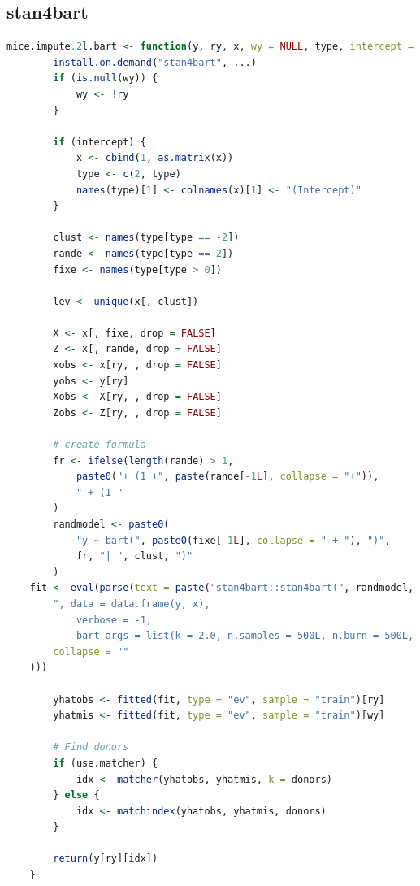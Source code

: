 \documentclass[3p,12pt,a4paper]{elsarticle}
\begin{document}
\subsection{stan4bart}
\begin{lstlisting}[language=R, caption={Imputation function for multilevel-BART with random effects and cross-level interactions}, label={lst:multilevelBART}]
    mice.impute.2l.bart <- function(y, ry, x, wy = NULL, type, intercept = TRUE, use.matcher = FALSE, donors = 5L, ...) {
        install.on.demand("stan4bart", ...)
        if (is.null(wy)) {
            wy <- !ry
        }
    
        if (intercept) {
            x <- cbind(1, as.matrix(x))
            type <- c(2, type)
            names(type)[1] <- colnames(x)[1] <- "(Intercept)"
        }
    
        clust <- names(type[type == -2])
        rande <- names(type[type == 2])
        fixe <- names(type[type > 0])
    
        lev <- unique(x[, clust])
    
        X <- x[, fixe, drop = FALSE]
        Z <- x[, rande, drop = FALSE]
        xobs <- x[ry, , drop = FALSE]
        yobs <- y[ry]
        Xobs <- X[ry, , drop = FALSE]
        Zobs <- Z[ry, , drop = FALSE]
    
        # create formula
        fr <- ifelse(length(rande) > 1,
            paste0("+ (1 +", paste(rande[-1L], collapse = "+")),
            " + (1 "
        )
        randmodel <- paste0(
            "y ~ bart(", paste0(fixe[-1L], collapse = " + "), ")",
            fr, "| ", clust, ")"
        )
    fit <- eval(parse(text = paste("stan4bart::stan4bart(", randmodel,
        ", data = data.frame(y, x),
            verbose = -1,
            bart_args = list(k = 2.0, n.samples = 500L, n.burn = 500L, n.thin = 1L, n.threads = 1))",
        collapse = ""
    )))
    
        yhatobs <- fitted(fit, type = "ev", sample = "train")[ry]
        yhatmis <- fitted(fit, type = "ev", sample = "train")[wy]
    
        # Find donors
        if (use.matcher) {
            idx <- matcher(yhatobs, yhatmis, k = donors)
        } else {
            idx <- matchindex(yhatobs, yhatmis, donors)
        }
    
        return(y[ry][idx])
    }
\end{lstlisting}
\end{document}
